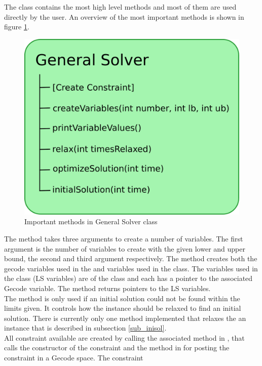 The \gensol class contains the most high level methods and most of them are used directly by the user. An overview of 
the most important methods is shown in figure \ref{fig_general}. \\ \noindent
\begin{figure}[!b] 
\begin{center}
\includegraphics[width=0.8\linewidth]{general2.pdf} \caption{Important methods in General Solver class} 
\label{fig_general}
\end{center} 
\end{figure} 
The method  takes three arguments to create a number of variables. The first argument 
is the number of variables to create with the given lower and upper bound, the second and third argument respectively. 
The method creates both the gecode variables used in the  and variables used in the  class. The variables used in the  class (LS variables) are of the class 
 and each has a pointer to the associated Gecode variable. The method returns pointers to the LS 
variables. \\ 
The method  is only used if an initial solution could not be found within the limits given. It controls 
how the instance should be relaxed to find an initial solution. There is currently only one method implemented that 
relaxes the an instance that is described in subsection \ref{sub_inisol}. \\
All constraint available are created by calling the associated method in \gensol, that calls the constructor 
of the constraint and the method in  for posting the constraint in a Gecode space. The constraint 
